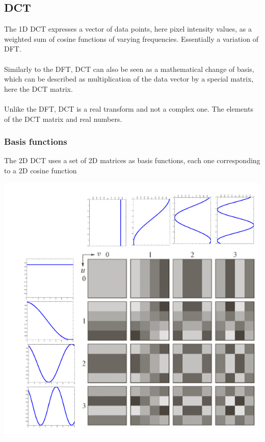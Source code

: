 \documentclass{article}[18pt]
\begin{document}
\subsection{DCT}
The 1D DCT expresses a vector of data points, here pixel intensity values, as a weighted sum of cosine functions of varying frequencies. Essentially a variation of DFT.\\
\\
Similarly to the DFT, DCT can also be seen as a mathematical change of basis, which can be described as multiplication of the data vector by a special matrix, here the DCT matrix.\\
\\
Unlike the DFT, DCT is a real transform and not a complex one. The elements of the DCT matrix and real numbers.
\subsubsection{Basis functions}
The 2D DCT uses a set of 2D matrices as basis functions, each one corresponding to a 2D cosine function
\begin{center}
	\includegraphics[scale=0.7]{Basis_Functions}
\end{center}
\end{document}
